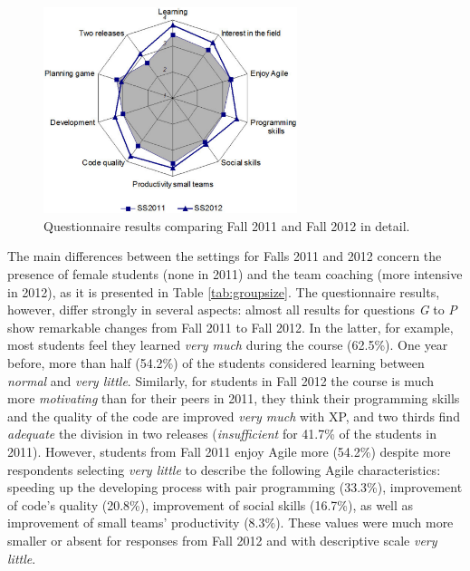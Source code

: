 \documentclass[conference]{IEEEtran}
\begin{document}
\begin{figure}[!t]
\centering
\includegraphics[width=7.4cm]{Resources/2011vs2012.pdf}
\caption{Questionnaire results comparing Fall 2011 and Fall 2012 in detail.}
\label{fig:11vs12}
\end{figure}

The main differences between the settings for Falls 2011 and 2012 concern the presence of female students (none in 2011) and the team coaching (more intensive in 2012), as it is presented in Table \ref{tab:groupsize}. The questionnaire results, however, differ strongly in several aspects: almost all results for questions \textit{G} to \textit{P} show remarkable changes from Fall 2011 to Fall 2012. In the latter, for example, most students feel they learned \textit{very much} during the course (62.5\%). One year before, more than half (54.2\%) of the students considered learning between \textit{normal} and \textit{very little}. Similarly, for students in Fall 2012 the course is much more \textit{motivating} than for their peers in 2011, they think their programming skills and the quality of the code are improved \textit{very much} with XP, and two thirds find \textit{adequate} the division in two releases (\textit{insufficient} for 41.7\% of the students in 2011). However, students from Fall 2011 enjoy Agile more (54.2\%) despite more respondents selecting \textit{very little} to describe the following Agile characteristics: speeding up the developing process with pair programming (33.3\%), improvement of code's quality (20.8\%),  improvement of social skills (16.7\%), as well as improvement of small teams' productivity (8.3\%). These values were much more smaller or absent for responses from Fall 2012 and with descriptive scale \textit{very little}.
\end{document}
